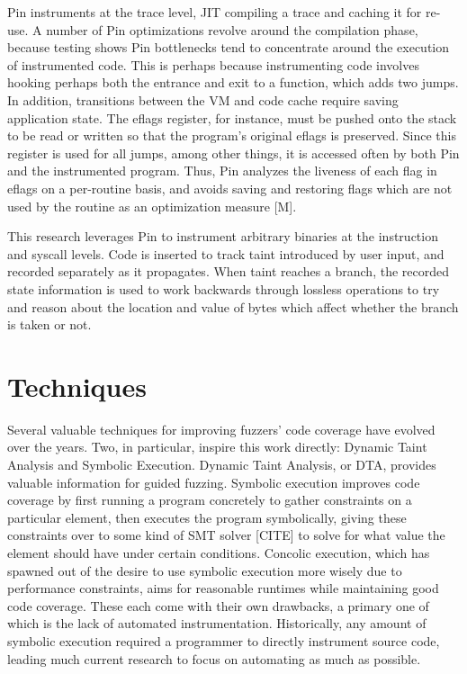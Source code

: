 \documentclass[11pt,expanded,copyright]{fsuthesis}
\begin{document}
Pin instruments at the trace level, JIT compiling a trace and caching it for re-use. A number of Pin optimizations revolve around the compilation phase, because testing shows Pin bottlenecks tend to concentrate around the execution of instrumented code. This is perhaps because instrumenting code involves hooking perhaps both the entrance and exit to a function, which adds two jumps. In addition, transitions between the VM and code cache require saving application state. The eflags register, for instance, must be pushed onto the stack to be read or written so that the program's original eflags is preserved. Since this register is used for all jumps, among other things, it is accessed often by both Pin and the instrumented program. Thus, Pin analyzes the liveness of each flag in eflags on a per-routine basis, and avoids saving and restoring flags which are not used by the routine as an optimization measure [M].

This research leverages Pin to instrument arbitrary binaries at the instruction and syscall levels. Code is inserted to track taint introduced by user input, and recorded separately as it propagates. When taint reaches a branch, the recorded state information is used to work backwards through lossless operations to try and reason about the location and value of bytes which affect whether the branch is taken or not.

\section{Techniques}

Several valuable techniques for improving fuzzers' code coverage have evolved over the years. Two, in particular, inspire this work directly: Dynamic Taint Analysis and Symbolic Execution. Dynamic Taint Analysis, or DTA, provides valuable information for guided fuzzing. Symbolic execution improves code coverage by first running a program concretely to gather constraints on a particular element, then executes the program symbolically, giving these constraints over to some kind of SMT solver [CITE] to solve for what value the element should have under certain conditions. Concolic execution, which has spawned out of the desire to use symbolic execution more wisely due to performance constraints, aims for reasonable runtimes while maintaining good code coverage. These each come with their own drawbacks, a primary one of which is the lack of automated instrumentation. Historically, any amount of symbolic execution required a programmer to directly instrument source code, leading much current research to focus on automating as much as possible.
\end{document}
